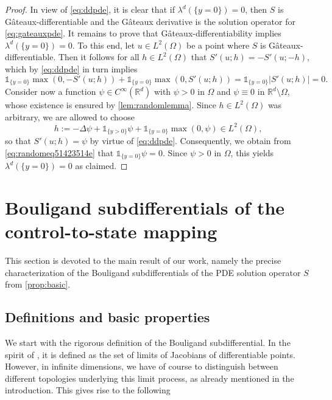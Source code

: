 \documentclass[reqno]{shinyart}
\begin{document}
\begin{proof}
    In view of \eqref{eq:ddpde}, it is clear that if $\lambda^d(\{y = 0 \}) = 0$, then $S$ 
    is G\^ateaux-differentiable and the G\^ateaux derivative is the solution operator for \eqref{eq:gateauxpde}. 
    It remains to prove that G\^ateaux-differentiability implies $\lambda^d(\{y = 0 \}) = 0$.
    To this end, let $u \in L^2(\Omega)$ be a point where $S$ is G\^ateaux-differentiable. 
    Then it follows for all $h\in L^2(\Omega)$ that $S'(u;h) = - S'(u;-h)$, 
    which by \eqref{eq:ddpde} in turn implies
    \begin{equation}\label{eq:randomeq51423514e}
        \mathbb{1}_{\{y = 0\}}\max(0, -S'(u;h))  +  \mathbb{1}_{\{y = 0\}}\max(0, S'(u;h)) 
        =  \mathbb{1}_{\{y = 0\}}|S'(u;h)| = 0.
    \end{equation}
    Consider now a function $\psi \in C^\infty({\mathbb{R}}^d)$ with $\psi > 0$ 
    in $\Omega$ and $\psi \equiv 0$ in ${\mathbb{R}}^d \setminus \Omega$, whose existence is ensured by \cref{lem:randomlemma}. 
    Since $h\in L^2(\Omega)$ was arbitrary, we are allowed to choose
    \begin{equation*}
        h := -\Delta \psi +   \mathbb{1}_{\{y > 0\}} \psi+ \mathbb{1}_{\{y = 0\}} \max(0, \psi) \in L^2(\Omega),
    \end{equation*}
    so that $S'(u;h) = \psi$ by virtue of \eqref{eq:ddpde}. Consequently, we obtain from  
    \eqref{eq:randomeq51423514e} that $\mathbb{1}_{\{y = 0\}}\psi = 0$.
    Since $\psi > 0$ in $\Omega$, this yields $\lambda^d(\{y = 0\})= 0$ as claimed. 
\end{proof}

\section{Bouligand subdifferentials of the control-to-state mapping}\label{sec:bouli}

This section is devoted to the main result of our work, namely the precise characterization of 
the Bouligand subdifferentials of the PDE solution operator $S$ from \cref{prop:basic}.

\subsection{Definitions and basic properties}

We start with the rigorous definition of the Bouligand subdifferential. In the spirit of \cite[Def.~2.12]{okz98}, 
it is defined as the set of limits of Jacobians of differentiable points. However, in infinite dimensions, 
we have of course to distinguish between different topologies underlying this limit process, as already mentioned in the 
introduction. This gives rise to the following
\end{document}
